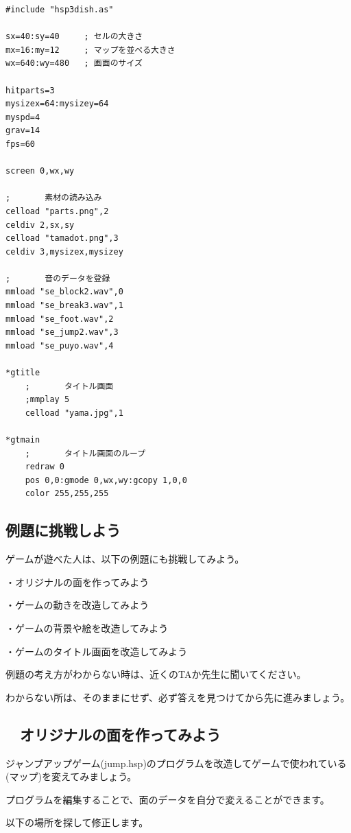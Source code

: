\begin{lstlisting}[caption=jump.hspのプログラムの一部]
#include "hsp3dish.as"

sx=40:sy=40     ; セルの大きさ
mx=16:my=12     ; マップを並べる大きさ
wx=640:wy=480   ; 画面のサイズ

hitparts=3
mysizex=64:mysizey=64
myspd=4
grav=14
fps=60

screen 0,wx,wy

;       素材の読み込み
celload "parts.png",2
celdiv 2,sx,sy
celload "tamadot.png",3
celdiv 3,mysizex,mysizey

;       音のデータを登録
mmload "se_block2.wav",0
mmload "se_break3.wav",1
mmload "se_foot.wav",2
mmload "se_jump2.wav",3
mmload "se_puyo.wav",4

*gtitle
	;       タイトル画面
	;mmplay 5
	celload "yama.jpg",1

*gtmain
	;       タイトル画面のループ
	redraw 0
	pos 0,0:gmode 0,wx,wy:gcopy 1,0,0
	color 255,255,255

\end{lstlisting}

\newpage
\subsection{例題に挑戦しよう}

ゲームが遊べた人は、以下の例題にも挑戦してみよう。

・オリジナルの面を作ってみよう

・ゲームの動きを改造してみよう

・ゲームの背景や絵を改造してみよう

・ゲームのタイトル画面を改造してみよう

例題の考え方がわからない時は、近くのTAか先生に聞いてください。

わからない所は、そのままにせず、必ず答えを見つけてから先に進みましょう。

\newpage
\subsection{\useOmetoiExample　オリジナルの面を作ってみよう}


\exampleinduction

ジャンプアップゲーム(jump.hsp)のプログラムを改造してゲームで使われている(マップ)を変えてみましょう。

プログラムを編集することで、面のデータを自分で変えることができます。

以下の場所を探して修正します。



